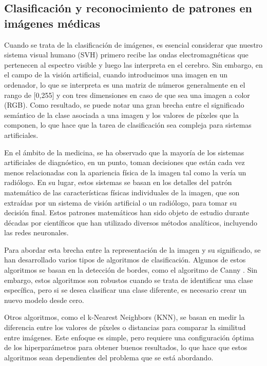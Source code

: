 \subsection*{Clasificación y reconocimiento de patrones en imágenes médicas}  

Cuando se trata de la clasificación de imágenes, es esencial considerar que nuestro sistema visual humano (SVH) primero recibe las ondas electromagnéticas que pertenecen al espectro visible y luego las interpreta en el cerebro. Sin embargo, en el campo de la visión artificial, cuando introducimos una imagen en un ordenador, lo que se interpreta es una matriz de números generalmente en el rango de [0,255] y con tres dimensiones en caso de que sea una imagen a color (RGB). Como resultado, se puede notar una gran brecha entre el significado semántico de la clase asociada a una imagen y los valores de píxeles que la componen, lo que hace que la tarea de clasificación sea compleja para sistemas artificiales. 

En el ámbito de la medicina, se ha observado que la mayoría de los sistemas artificiales de diagnóstico, en un punto, toman decisiones que están cada vez menos relacionadas con la apariencia física de la imagen tal como la vería un radiólogo. En su lugar, estos sistemas se basan en los detalles del patrón matemático de las características físicas individuales de la imagen, que son extraídas por un sistema de visión artificial o un radiólogo, para tomar su decisión final. Estos patrones matemáticos han sido objeto de estudio durante décadas por científicos que han utilizado diversos métodos analíticos, incluyendo las redes neuronales. 

Para abordar esta brecha entre la representación de la imagen y su significado, se han desarrollado varios tipos de algoritmos de clasificación. Algunos de estos algoritmos se basan en la detección de bordes, como el algoritmo de Canny . 
Sin embargo, estos algoritmos son robustos cuando se trata de identificar una clase específica, pero si se desea clasificar una clase diferente, es necesario crear un nuevo modelo desde cero.

Otros algoritmos, como el k-Nearest Neighbors (KNN), se basan en medir la diferencia entre los valores de píxeles o distancias para comparar la similitud entre imágenes. Este enfoque es simple, pero requiere una configuración óptima de los hiperparámetros para obtener buenos resultados, lo que hace que estos algoritmos sean dependientes del problema que se está abordando.


